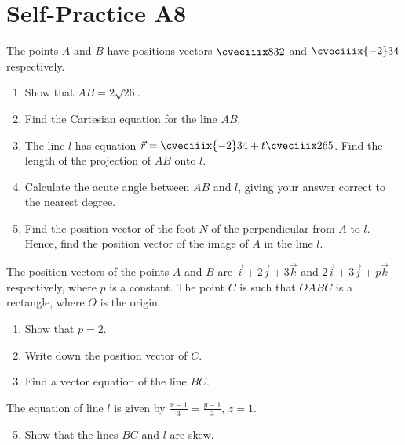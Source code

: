 \section{Self-Practice A8}

\begin{problem}
    The points $A$ and $B$ have positions vectors $\cveciiix832$ and $\cveciiix{-2}34$ respectively.

    \begin{enumerate}
        \item Show that $AB = 2\sqrt{26}$.
        \item Find the Cartesian equation for the line $AB$.
        \item The line $l$ has equation $\vec r = \cveciiix{-2}34 + t\cveciiix265$. Find the length of the projection of $AB$ onto $l$.
        \item Calculate the acute angle between $AB$ and $l$, giving your answer correct to the nearest degree.
        \item Find the position vector of the foot $N$ of the perpendicular from $A$ to $l$. Hence, find the position vector of the image of $A$ in the line $l$.
    \end{enumerate}
\end{problem}

\begin{problem}
    The position vectors of the points $A$ and $B$ are $\vec i + 2 \vec j + 3 \vec k$ and $2\vec i + 3 \vec j + p \vec k$ respectively, where $p$ is a constant. The point $C$ is such that $OABC$ is a rectangle, where $O$ is the origin.

    \begin{enumerate}
        \item Show that $p = 2$.
        \item Write down the position vector of $C$.
        \item Find a vector equation of the line $BC$.
    \end{enumerate}

    The equation of line $l$ is given by $\frac{x-1}{3} = \frac{y-1}{3}$, $z = 1$.

    \begin{enumerate}
        \setcounter{enumi}{4}
        \item Show that the lines $BC$ and $l$ are skew.
    \end{enumerate}
\end{problem}

